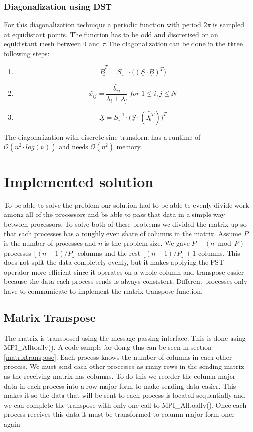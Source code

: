 \documentclass{article}
\begin{document}
\subsubsection{Diagonalization using DST}
For this diagonalization technique a periodic function with period $2\pi$ is sampled at equidistant points. The function has to be odd and discretized on an equidistant mesh between 0 and $\pi$.The diagonalization can be done in the three following steps:
\begin{enumerate}
\item $$ \underline{\tilde{B}^T}=\underline{S^{-1}}\cdot\big((\underline{S}\cdot\underline{B})^T\big)$$
\item $$ \tilde{x_{ij}}=\frac{\tilde{b_{ij}}}{\lambda_i+\lambda_j}\;for\;1\leq i,j\leq N$$
\item $$ \underline{X}=\underline{S^{-1}}\cdot\big(\underline{S}\cdot(\underline{\tilde{X^T}})\big)^T$$
\end{enumerate}
The diagonalization with discrete sine transform has a runtime of $\mathcal{O}(n^2\cdot log(n))$ and needs $\mathcal{O}(n^2)$ memory.

\section{Implemented solution}
	To be able to solve the problem our solution had to be able to evenly divide work among all of the processors and be able to pass that data in a simple way between processors. To solve both of these problems we divided the matrix up so that each processes has a roughly even share of columns in the matrix. Assume $P$ is the number of processes and $n$ is the problem size. We gave $P - (n \bmod P)$ processes $\lfloor (n-1)/P \rfloor$ columns and the rest $\lfloor (n-1)/P \rfloor + 1$ columns. This does not split the data completely evenly, but it makes applying the FST operator more efficient since it operates on a whole column and transpose easier because the data each process sends is always consistent. Different processes only have to communicate to implement the matrix transpose function.

\subsection{Matrix Transpose}
	The matrix is transposed using the message passing interface. This is done using MPI\_Alltoallv(). A code sample for doing this can be seen in section \ref{matrixtranspose}. Each process knows the number of columns in each other process. We must send each other processes as many rows in the sending matrix as the receiving matrix has columns. To do this we reorder the column major data in each process into a row major form to make sending data easier. This makes it so the data that will be sent to each process is located sequentially and we can complete the transpose with only one call to MPI\_Alltoallv(). Once each process receives this data it must be transformed to column major form once again.
\end{document}
